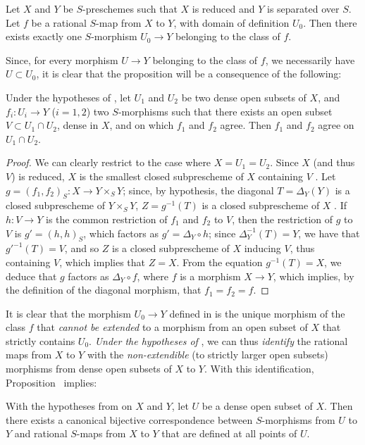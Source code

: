 \begin{proposition}[7.2.2]
\label{I.7.2.2}
Let
$X$ and $Y$ be $S$-preschemes such that $X$ is reduced and $Y$ is separated over $S$.
Let $f$ be a rational $S$-map from $X$ to $Y$, with domain of definition $U_0$.
Then there exists exactly one $S$-morphism $U_0\to Y$ belonging to the class of $f$.
\end{proposition}

Since, for every morphism $U\to Y$ belonging to the class of $f$, we necessarily have $U\subset U_0$, it is clear that the proposition will be a consequence of the following:

\begin{lemma}[7.2.2.1]
\label{I.7.2.2.1}
Under the hypotheses of , let $U_1$ and $U_2$ be two dense open subsets of $X$, and $f_i:U_i\to Y$ ($i=1,2$) two $S$-morphisms such that there exists an open subset $V\subset U_1\cap U_2$, dense in $X$, and on which $f_1$ and $f_2$ agree.
Then $f_1$ and $f_2$ agree on $U_1\cap U_2$.
\end{lemma}

\begin{proof}
We can clearly restrict to the case where $X=U_1=U_2$.
Since $X$ (and thus $V$) is reduced, $X$ is the smallest closed subprescheme of $X$ containing $V$ .
Let $g=(f_1,f_2)_S:X\to Y\times_S Y$; since, by hypothesis, the diagonal $T=\Delta_Y(Y)$ is a closed subprescheme of $Y\times_S Y$, $Z=g^{-1}(T)$ is a closed subprescheme of $X$ .
If $h:V\to Y$ is the common restriction of $f_1$ and $f_2$ to $V$, then the restriction of $g$ to $V$ is $g'=(h,h)_S$, which factors as $g'=\Delta_Y\circ h$; since $\Delta_Y^{-1}(T)=Y$, we have that $g'^{-1}(T)=V$, and so $Z$ is a closed subprescheme of $X$ inducing $V$, thus containing $V$, which implies that $Z=X$.
From the equation $g^{-1}(T)=X$, we deduce  that $g$ factors as $\Delta_Y\circ f$, where $f$ is a morphism $X\to Y$, which implies, by the definition of the diagonal morphism, that $f_1=f_2=f$.
\end{proof}

It is clear that the morphism $U_0\to Y$ defined in  is the unique morphism of the class $f$ that \emph{cannot be extended} to a morphism from an open subset of $X$ that strictly contains $U_0$.
\emph{Under the hypotheses of }, we can thus \emph{identify} the rational maps from $X$ to $Y$ with the \emph{non-extendible} (to strictly larger open subsets) morphisms from dense open subsets of $X$ to $Y$.
With this identification, Proposition~ implies:
\begin{corollary}[7.2.3]
\label{I.7.2.3}
With the hypotheses from  on $X$ and $Y$, let $U$ be a dense open subset of $X$.
Then there exists a canonical bijective correspondence between $S$-morphisms from $U$ to $Y$ and rational $S$-maps from $X$ to $Y$ that are defined at all points of $U$.
\end{corollary}

